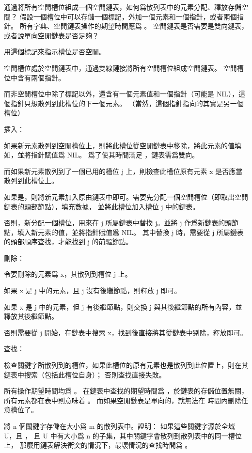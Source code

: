 \startEXERCISE
通過將所有空閒槽位組成一個空閒鏈表，如何爲散列表中的元素分配、釋放存儲空間？
假設一個槽位中可以存儲一個標記，外加一個元素和一個指針，或者兩個指針。
所有字典、空閒鏈表操作的期望時間應爲 。
空閒鏈表是否需要是雙向鏈表，或者說單向空閒鏈表是否足夠？
\stopEXERCISE

\startANSWER
用這個標記來指示槽位是否空閒。

空閒槽位處於空閒鏈表中，通過雙線鏈接將所有空閒槽位組成空閒鏈表。
空閒槽位中含有兩個指針。

而非空閒槽位中除了標記以外，還含有一個元素值和一個指針（可能是 NIL），這個指針只想散列到此槽位的下一個元素。
（當然，這個指針指向的其實是另一個槽位）

{\EMP 插入：}

如果新元素散列到空閒槽位上，則將此槽位從空閒鏈表中移除，將此元素的值填如，並將指針賦值爲 NIL。
爲了使其時間滿足 ，鏈表需爲雙向。

而如果新元素散列到了一個已用的槽位 j 上，則檢查此槽位原有元素 x 是否應當散列到此槽位上。

如果是，則將新元素加入原由鏈表中即可。需要先分配一個空閒槽位（即取出空閒鏈表的頭部節點），填充數據，
並將此槽位加入槽位 j 中的鏈表。

否則，新分配一個槽位，用來在 j 所屬鏈表中替換 j。並將 j 作爲新鏈表的頭節點，填入新元素的值，並將指針賦值爲 NIL。
其中替換 j 時，需要從 j 所屬鏈表的頭部順序查找，才能找到 j 的前驅節點。

{\EMP 刪除：}

令要刪除的元素爲 x，其散列到槽位 j 上。

如果 x 是 j 中的元素，且 j 沒有後繼節點，則釋放 j 即可。

如果 x 是 j 中的元素，但 j 有後繼節點，則交換 j 與其後繼節點的所有內容，並釋放其後繼節點。

否則需要從 j 開始，在鏈表中搜索 x，找到後直接將其從鏈表中剔除，釋放即可。

{\EMP 查找：}

檢查關鍵字所散列到的槽位，如果此槽位的原有元素也是散列到此位置上，則在其鏈表中搜索（包括此槽位自身）；
否則查找直接失敗。

所有操作期望時間均爲 。
在鏈表中查找的期望時間爲 ，於鏈表的存儲位置無關，
所有元素都在表中則意味着 。
而如果空閒鏈表是單向的，就無法在  時間內刪除任意槽位了。
\stopANSWER

\startEXERCISE
將 n 個關鍵字存儲在大小爲 m 的散列表中。證明：
如果這些關鍵字源於全域 U，且 ，
且 U 中有大小爲 n 的子集，其中關鍵字會散列到散列表中的同一槽位上，
那麼用鏈表解決衝突的情況下，最壞情況的查找時間爲 。
\stopEXERCISE

